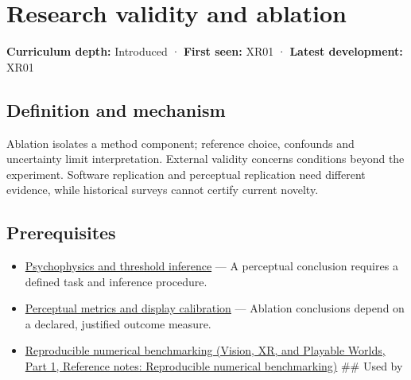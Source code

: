 \hypertarget{appendix-65788587ef78}{}\label{referencestart:appendix-65788587ef78}
\section{Research validity and ablation}\label{appendix-65788587ef78-research-validity-and-ablation}

\hypertarget{appendix-65788587ef78-research-validity-and-ablation}{}

\textbf{Curriculum depth:} Introduced · \textbf{First seen:} XR01 · \textbf{Latest development:} XR01

\begin{allmightroledefinition}

\subsection{Definition and mechanism}\label{appendix-65788587ef78-definition-and-mechanism}

\hypertarget{appendix-65788587ef78-definition-and-mechanism}{}

Ablation isolates a method component; reference choice, confounds and uncertainty limit interpretation. External validity concerns conditions beyond the experiment. Software replication and perceptual replication need different evidence, while historical surveys cannot certify current novelty.

\end{allmightroledefinition}

\subsection{Prerequisites}\label{appendix-65788587ef78-prerequisites}

\hypertarget{appendix-65788587ef78-prerequisites}{}

\begin{itemize}
\item
  \hyperref[appendix-1759f03e8ce7]{Psychophysics and threshold inference} --- A perceptual conclusion requires a defined task and inference procedure.
\item
  \hyperref[appendix-b2c1846508bf]{Perceptual metrics and display calibration} --- Ablation conclusions depend on a declared, justified outcome measure.
\item
  \href{../07-Vision-XR-and-Playable-Worlds-P01/main.pdf\#appendix-b9db93e28371}{Reproducible numerical benchmarking (Vision, XR, and Playable Worlds, Part 1, Reference notes: Reproducible numerical benchmarking)} \#\# Used by
\end{itemize}

